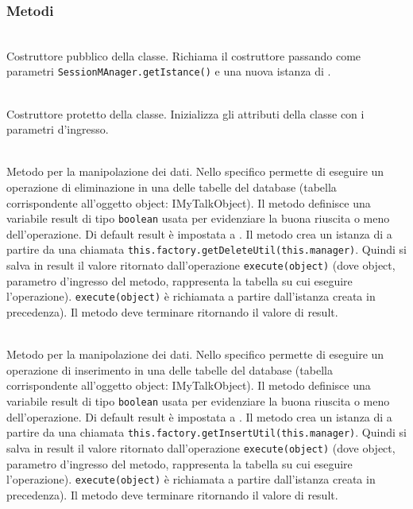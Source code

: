 \subsubsection*{Metodi}

\begin{description}
	\item{}\\
	Costruttore pubblico della classe. Richiama il costruttore  passando come parametri \texttt{SessionMAnager.getIstance()} e una nuova istanza di .
	
	\item{}\\
	Costruttore protetto della classe. Inizializza gli attributi della classe con i parametri d'ingresso.
	
	\item{}\\
	Metodo per la manipolazione dei dati. Nello specifico permette di eseguire un operazione di eliminazione in una delle tabelle del database (tabella corrispondente all'oggetto object: IMyTalkObject). Il metodo definisce una variabile result di tipo \texttt{boolean} usata per evidenziare la buona riuscita o meno dell'operazione. Di default result è impostata a . Il metodo crea un istanza di  a partire da una chiamata \verb|this.factory.getDeleteUtil(this.manager)|. Quindi si salva in result il valore ritornato dall'operazione \verb|execute(object)| (dove object, parametro d'ingresso del metodo, rappresenta la tabella su cui eseguire l'operazione). \verb|execute(object)| è richiamata a partire dall'istanza  creata in precedenza). Il metodo deve terminare ritornando il valore di result.
	
	
	\item{}\\
	Metodo per la manipolazione dei dati. Nello specifico permette di eseguire un operazione di inserimento in una delle tabelle del database (tabella corrispondente all'oggetto object: IMyTalkObject). Il metodo definisce una variabile result di tipo \texttt{boolean} usata per evidenziare la buona riuscita o meno dell'operazione. Di default result è impostata a . Il metodo crea un istanza di  a partire da una chiamata \verb|this.factory.getInsertUtil(this.manager)|. Quindi si salva in result il valore ritornato dall'operazione \verb|execute(object)| (dove object, parametro d'ingresso del metodo, rappresenta la tabella su cui eseguire l'operazione). \verb|execute(object)| è richiamata a partire dall'istanza  creata in precedenza). Il metodo deve terminare ritornando il valore di result.
	

\end{description}

